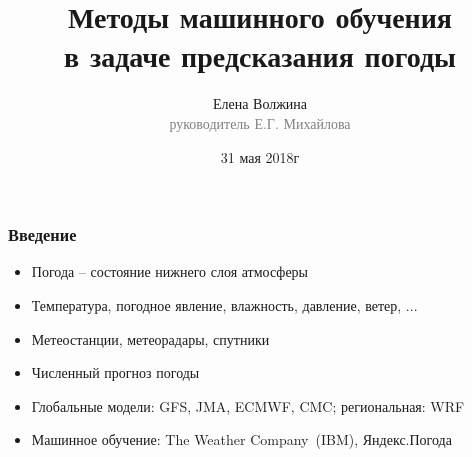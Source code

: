 \documentclass{beamer}
\begin{document}
\title{Методы машинного обучения \\в задаче предсказания погоды}
\author{Елена Волжина\\{\footnotesize\textcolor{gray}{руководитель Е.Г. Михайлова}}}
\date{31 мая 2018г}
\frame{\titlepage}

\begin{frame}\frametitle{\large Введение}
\begin{itemize}
    \item Погода -- состояние нижнего слоя атмосферы %
    
    \item Температура, погодное явление, влажность, давление, ветер, ...
    
    \item Метеостанции, метеорадары, спутники
    
    \item Численный прогноз погоды %
    
    \item Глобальные модели: GFS, JMA, ECMWF, CMC; региональная: WRF
    
    \item Машинное обучение: The Weather Company~(IBM), Яндекс.Погода

\end{itemize}
\end{frame}
\end{document}
